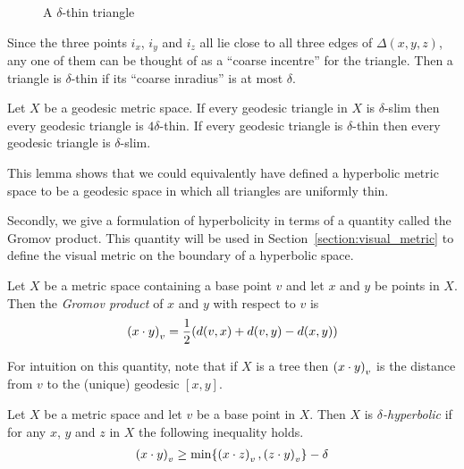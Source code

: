 \begin{figure}
  \begin{center}
    
  \end{center}
  \caption{A $\delta$-thin triangle}
  \label{figure:delta_thin}
\end{figure}

Since the three points $i_x$, $i_y$ and $i_z$ all lie close to all three edges of $\Delta(x, y, z)$, any one of them can be thought of as a ``coarse incentre'' for the triangle.
Then a triangle is $\delta$-thin if its ``coarse inradius'' is at most $\delta$. 

\begin{lemma}\label{lemma:thin_vs_slim}
  Let $X$ be a geodesic metric space.
  If every geodesic triangle in $X$ is $\delta$-slim then every geodesic triangle is $4\delta$-thin.
  If every geodesic triangle is $\delta$-thin then every geodesic triangle is $\delta$-slim.
\end{lemma}

This lemma shows that we could equivalently have defined a hyperbolic metric space to be a geodesic space in which all triangles are uniformly thin.

Secondly, we give a formulation of hyperbolicity in terms of a quantity called the Gromov product.
This quantity will be used in Section~\ref{section:visual_metric} to define the visual metric on the boundary of a hyperbolic space.

\begin{definition}\label{definition:gromov_product}
  Let $X$ be a metric space containing a base point $v$ and let $x$ and $y$ be points in $X$.
  Then the \emph{Gromov product} of $x$ and $y$ with respect to $v$ is
  \begin{align}
    \gromprod[v]{x}{y} = \frac{1}{2}(d(v, x) + d(v, y) - d(x, y))
  \end{align}
\end{definition}

For intuition on this quantity, note that if $X$ is a tree then $\gromprod[v]{x}{y}$ is the distance from $v$ to the (unique) geodesic $[x,y]$.

\begin{definition}\label{definition:hyperbolic_spaces2}
  Let $X$ be a metric space and let $v$ be a base point in $X$.
  Then $X$ is \emph{$\delta$-hyperbolic} if for any $x$, $y$ and $z$ in $X$ the following inequality holds.
  \begin{align}
    \gromprod[v]{x}{y} \geq \min\{\gromprod[v]{x}{z}, \gromprod[v]{z}{y}\} - \delta
  \end{align}
\end{definition}

